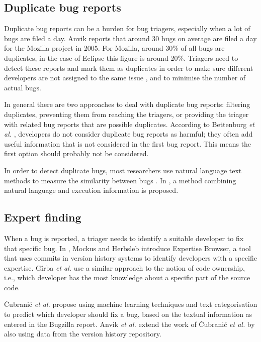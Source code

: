 \subsection{Duplicate bug reports}
Duplicate bug reports can be a burden for bug triagers, especially when a lot of bugs are filed a day. Anvik \cite{Anvik2005, Anvik2006} reports that around 30 bugs on average are filed a day for the Mozilla project in 2005. For Mozilla, around 30\% of all bugs are duplicates, in the case of Eclipse this figure is around 20\%. Triagers need to detect these reports and mark them as duplicates in order to make sure different developers are not assigned to the same issue \cite{Sun2011}, and to minimise the number of actual bugs. 

In general there are two approaches to deal with duplicate bug reports: filtering duplicates, preventing them from reaching the triagers, or providing the triager with related bug reports that are possible duplicates. According to Bettenburg \emph{et al.} \cite{Bettenburg2008a}, developers do not consider duplicate bug reports as harmful; they often add useful information that is not considered in the first bug report. This means the first option should probably not be considered.

In order to detect duplicate bugs, most researchers use natural language text methods to measure the similarity between bugs \cite{Sun2011}. In \cite{Wang2008}, a method combining natural language and execution information is proposed.

\subsection{Expert finding}
When a bug is reported, a triager needs to identify a suitable developer to fix that specific bug. In \cite{Mockus}, Mockus and Herbsleb introduce Expertise Browser, a tool that uses commits in version history systems to identify developers with a specific expertise. G\^{i}rba \emph{et al.} \cite{Girba2005} use a similar approach to the notion of code ownership, i.e., which developer has the most knowledge about a specific part of the source code. 

\v{C}ubrani\'{c} \emph{et al.} \cite{Murphy2004} propose using machine learning techniques and text categorisation to predict which developer should fix a bug, based on the textual information as entered in the Bugzilla report. Anvik \emph{et al.} \cite{Anvik2006} extend the work of \v{C}ubrani\'{c} \emph{et al.} by also using data from the version history repository.

